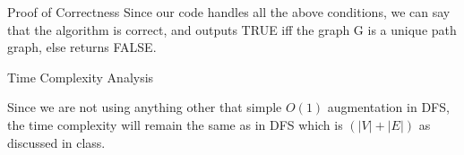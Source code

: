 \documentclass{article}
\begin{document}
\begin{question}
\begin{qsection}{Proof of Correctness}
		Since our code handles all the above conditions, we can say that the algorithm is correct, and outputs TRUE iff the graph G is a unique path graph, else returns FALSE\@.

	\end{qsection}

	\begin{qsection}{Time Complexity Analysis}
		
		Since we are not using anything other that simple $O(1)$ augmentation in DFS, the time complexity will remain the same as in DFS which is $(|V| + |E|)$ as discussed in class.

	\end{qsection}

\end{question}
\end{document}
